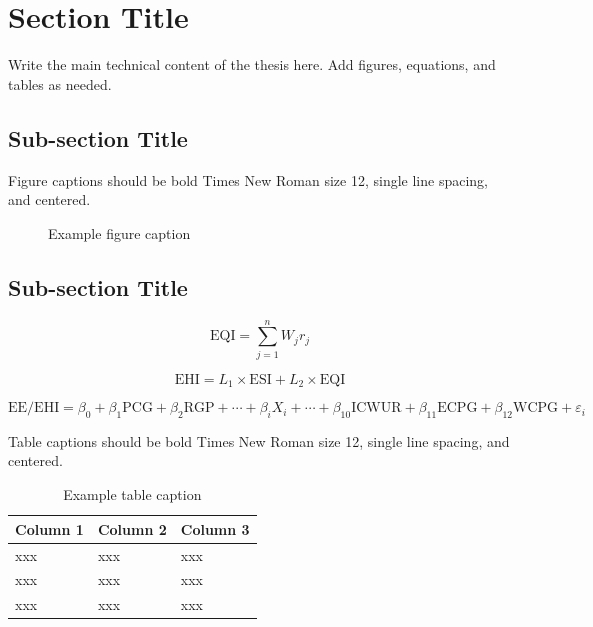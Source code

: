 \documentclass[12pt,a4paper]{report}
\begin{document}
\section{Section Title}

Write the main technical content of the thesis here. Add figures, equations, and tables as needed.

\subsection{Sub-section Title}

Figure captions should be bold Times New Roman size 12, single line spacing, and centered.

\begin{figure}[htbp]
\centering
\fbox{\rule{0pt}{4cm}\rule{0.75\textwidth}{0pt}}
\caption{Example figure caption}
\label{fig:example}
\end{figure}

\subsection{Sub-section Title}

\begin{equation}
\mathrm{EQI}=\sum_{j=1}^{n} W_j r_j
\label{eq:eqi}
\end{equation}

\begin{equation}
\mathrm{EHI}=L_1 \times \mathrm{ESI}+L_2 \times \mathrm{EQI}
\label{eq:ehi}
\end{equation}

\begin{equation}
\mathrm{EE}/\mathrm{EHI}=\beta_0+\beta_1\mathrm{PCG}+\beta_2\mathrm{RGP}+\cdots+\beta_iX_i+\cdots+\beta_{10}\mathrm{ICWUR}+\beta_{11}\mathrm{ECPG}+\beta_{12}\mathrm{WCPG}+\varepsilon_i
\label{eq:regression}
\end{equation}

Table captions should be bold Times New Roman size 12, single line spacing, and centered.

\begin{table}[htbp]
\centering
\caption{Example table caption}
\label{tab:example}
\begin{tabular}{lll}
\toprule
Column 1 & Column 2 & Column 3\\
\midrule
xxx & xxx & xxx\\
xxx & xxx & xxx\\
xxx & xxx & xxx\\
\bottomrule
\end{tabular}
\end{table}
\end{document}
